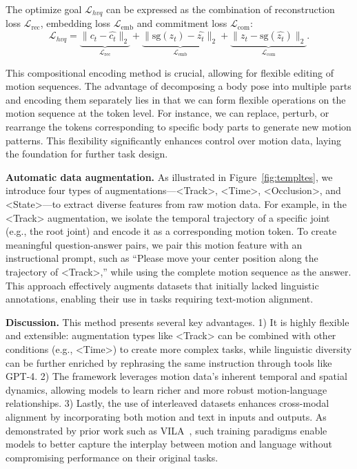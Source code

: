 The optimize goal $\mathcal{L}_{hvq}$ can be expressed as the combination of reconstruction loss $\mathcal{L}_{\text{rec}}$, embedding loss $\mathcal{L}_{\text{emb}}$ and commitment loss $\mathcal{L}_{\text{com}}$:
\begin{equation}
      \mathcal{L}_{hvq} = \underbrace{\|{c_t} - \hat{{c_t}}\|_2}_{\mathcal{L}_{\text{rec}}} + \underbrace{\|\text{sg}({z_t})-\hat{{z_t}}\|_2}_{\mathcal{L}_{\text{emb}}} + \underbrace{\|{z_t}-\text{sg}(\hat{z_t})\|_2}_{\mathcal{L}_{\text{com}}}.
\end{equation}


This compositional encoding method is crucial, allowing for flexible editing of motion sequences. The advantage of decomposing a body pose into multiple parts and encoding them separately lies in that we can form flexible operations on the motion sequence at the token level. For instance, we can replace, perturb, or rearrange the tokens corresponding to specific body parts to generate new motion patterns. This flexibility significantly enhances control over motion data, laying the foundation for further task design.



\textbf{Automatic data augmentation. }
As illustrated in Figure~\ref{fig:templtes}, we introduce four types of augmentations—<Track>, <Time>, <Occlusion>, and <State>—to extract diverse features from raw motion data. For example, in the <Track> augmentation, we isolate the temporal trajectory of a specific joint (e.g., the root joint) and encode it as a corresponding motion token. To create meaningful question-answer pairs, we pair this motion feature with an instructional prompt, such as “Please move your center position along the trajectory of <Track>,” while using the complete motion sequence as the answer. This approach effectively augments datasets that initially lacked linguistic annotations, enabling their use in tasks requiring text-motion alignment.

\textbf{Discussion. }
This method presents several key advantages. 
1) It is highly flexible and extensible: augmentation types like <Track> can be combined with other conditions (e.g., <Time>) to create more complex tasks, while linguistic diversity can be further enriched by rephrasing the same instruction through tools like GPT-4\cite{achiam2023gpt}.
2) The framework leverages motion data's inherent temporal and spatial dynamics, allowing models to learn richer and more robust motion-language relationships.
3) Lastly, the use of interleaved datasets enhances cross-modal alignment by incorporating both motion and text in inputs and outputs. As demonstrated by prior work such as VILA~\cite{lin2024vila}, such training paradigms enable models to better capture the interplay between motion and language without compromising performance on their original tasks.

